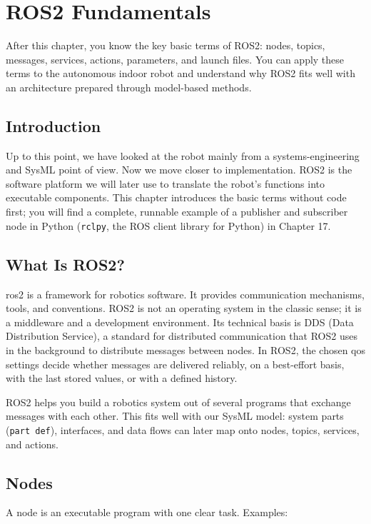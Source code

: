 \chapter{ROS2 Fundamentals}

\begin{lernziele}
After this chapter, you know the key basic terms of ROS2: nodes, topics, messages, services, actions, parameters, and launch files. You can apply these terms to the autonomous indoor robot and understand why ROS2 fits well with an architecture prepared through model-based methods.
\end{lernziele}

\section{Introduction}
Up to this point, we have looked at the robot mainly from a systems-engineering and SysML point of view. Now we move closer to implementation. ROS2 is the software platform we will later use to translate the robot's functions into executable components. This chapter introduces the basic terms without code first; you will find a complete, runnable example of a publisher and subscriber node in Python (\texttt{rclpy}, the ROS client library for Python) in Chapter 17.

\section{What Is ROS2?}
\gls{ros2} is a framework for robotics software. It provides communication mechanisms, tools, and conventions. ROS2 is not an operating system in the classic sense; it is a \gls{middleware} and a development environment. Its technical basis is DDS (Data Distribution Service), a standard for distributed communication that ROS2 uses in the background to distribute messages between nodes. In ROS2, the chosen \gls{qos} settings decide whether messages are delivered reliably, on a best-effort basis, with the last stored values, or with a defined history.

ROS2 helps you build a robotics system out of several programs that exchange messages with each other. This fits well with our SysML model: system parts (\texttt{part def}), interfaces, and data flows can later map onto nodes, topics, services, and actions.

\section{Nodes}
A node is an executable program with one clear task. Examples:

